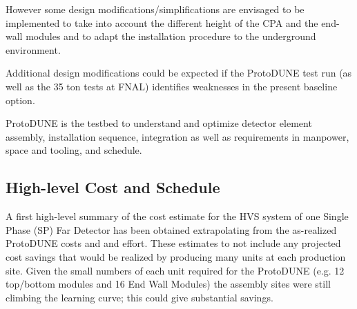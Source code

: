 However some design modifications/simplifications are envisaged to be implemented to take into account the different height of the CPA  and the end-wall modules and to adapt the installation procedure to the underground environment.

Additional design modifications could be expected if the ProtoDUNE test run (as well as the 35 ton tests at FNAL) identifies weaknesses in the present baseline option.


ProtoDUNE is the testbed to understand and optimize detector element assembly, installation sequence, integration as well as requirements in manpower, space and tooling, and schedule. 



%
%
%
\subsection{High-level Cost and Schedule}
\label{sec:fdsp-hv-org-cs}

A first high-level summary of the cost estimate for the HVS system of one Single Phase (SP) Far Detector has been obtained extrapolating from the as-realized ProtoDUNE costs and and effort. These estimates to not include any projected cost savings that would be realized by producing many units at each production site. Given the small numbers of each unit required for the ProtoDUNE (e.g. 12 top/bottom modules and 16 End Wall Modules) the assembly sites were still climbing the learning curve; this could give substantial savings. 

